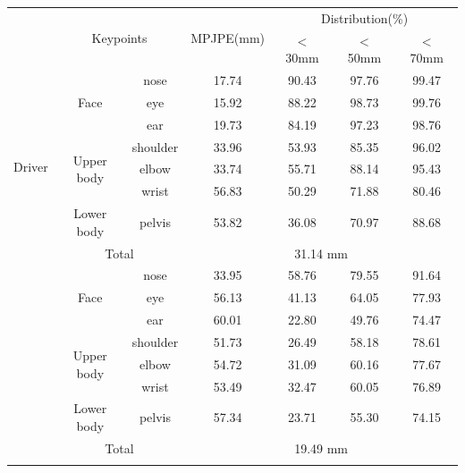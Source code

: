 \documentclass[letterpaper]{article} %
\begin{document}
\begin{table}[t]
\centering
\begin{tabular}{@{}c | c | c | c | c | c |c @{} }
\Xhline{3\arrayrulewidth}
& \multicolumn{2}{c|}{\multirow{2}{*}{Keypoints}} & \multirow{2}{*}{MPJPE(mm)} &  \multicolumn{3}{c}{Distribution(\%)}\\\cline{5-7}
&           \multicolumn{2}{c|}{}                  & & $<$ 30mm & $<$ 50mm & $<$ 70mm \\\cline{1-7}
\multirow{8}{*}{Driver} &\multirow{3}{*}{Face} & nose &  17.74 & 90.43 & 97.76 & 99.47 \\\cline{ 3-7}
& &eye      &  15.92 & 88.22 & 98.73 & 99.76 \\\cline{3-7}
& &ear      & 19.73 & 84.19 & 97.23 & 98.76 \\\cline{ 2-7}
&\multirow{3}{*}{Upper body}&shoulder & 33.96 & 53.93 & 85.35 & 96.02 \\\cline{ 3-7}
& & elbow      & 33.74 & 55.71 & 88.14 & 95.43 \\\cline{ 3-7}
& & wrist      & 56.83 & 50.29 & 71.88 & 80.46 \\\cline{ 2-7}
&Lower body& pelvis      & 53.82 & 36.08 & 70.97 & 88.68\\\cline{ 2-7}
& \multicolumn{2}{c|}{Total} & \multicolumn{4}{c}{31.14 mm}\\\Xhline{3\arrayrulewidth}

\multirow{8}{*}{Passenger} &\multirow{3}{*}{Face} & nose & 33.95       & 58.76       & 79.55       & 91.64 \\\cline{ 3-7}
& &eye      & 56.13 & 41.13 & 64.05 & 77.93 \\\cline{3-7}
& &ear      & 60.01 & 22.80 & 49.76 & 74.47 \\\cline{ 2-7}
&\multirow{3}{*}{Upper body}&shoulder & 51.73 & 26.49 & 58.18 & 78.61 \\\cline{ 3-7}
& & elbow      & 54.72 & 31.09 & 60.16 & 77.67 \\\cline{ 3-7}
& & wrist      & 53.49 & 32.47 & 60.05 & 76.89 \\\cline{ 2-7}
&Lower body& pelvis      & 57.34 & 23.71 & 55.30 & 74.15\\\cline{ 2-7}
& \multicolumn{2}{c|}{Total} & \multicolumn{4}{c}{19.49 mm}\\\Xhline{3\arrayrulewidth}


\end{tabular}
\end{table}
\end{document}
